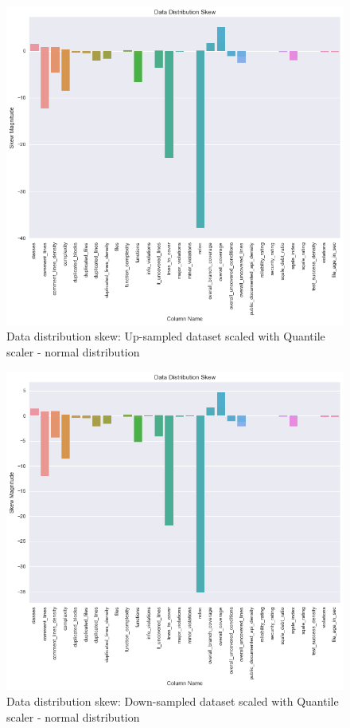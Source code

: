 \begin{figure}
    \centering
    \includegraphics[scale=0.6]{Figures/feature-dist/Data_Distribution_Skew_quantile-normal_upsampled.png}
    \caption{Data distribution skew: Up-sampled dataset scaled with Quantile scaler - normal distribution}
    \label{fig:feature-dist:skew:quantile-normal-upsample}
\end{figure}

\begin{figure}
    \centering
    \includegraphics[scale=0.6]{Figures/feature-dist/Data_Distribution_Skew_quantile-normal_downsampled.png}
    \caption{Data distribution skew: Down-sampled dataset scaled with Quantile scaler - normal distribution}
    \label{fig:feature-dist:skew:quantile-normal-downsample}
\end{figure}

